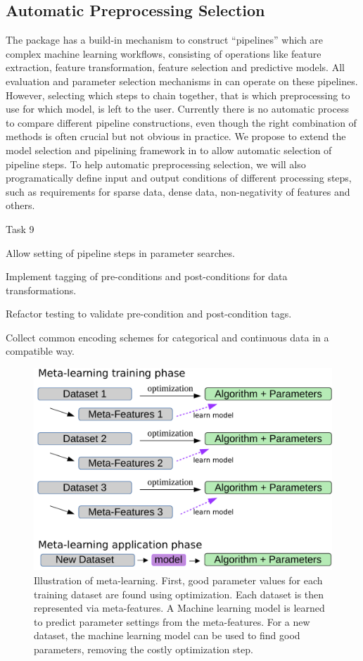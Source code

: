 \subsection{Automatic Preprocessing Selection}
The \sklearn{} package has a build-in mechanism to construct
``pipelines'' which are complex machine learning workflows, consisting of
operations like feature extraction, feature transformation, feature selection
and predictive models.  All evaluation and parameter selection mechanisms in
\sklearn{} can operate on these pipelines.
However, selecting which steps to chain together, that is which preprocessing
to use for which model, is left to the user. Currently there is no
automatic process to compare different pipeline constructions, even though
the right combination of methods is often crucial but not obvious in practice.
We propose to extend the model selection and pipelining framework in \sklearn{}
to allow automatic selection of pipeline steps.
To help automatic preprocessing selection, we will also programatically
define input and output conditions of different processing steps, such
as requirements for sparse data, dense data, non-negativity of features and others.
\begin{labeling}{Task 9}
    \itemsep-4pt
    \item [Task 6] Allow setting of pipeline steps in \sklearn{} parameter searches.
    \item [Task 7] Implement tagging of pre-conditions and post-conditions for data transformations.
    \item [Task 8] Refactor \sklearn{} testing to validate pre-condition and post-condition tags.
    \item [Task 9] Collect common encoding schemes for categorical and
        continuous data in a \sklearn{} compatible way.
\end{labeling}

\begin{figure}
    \centering
    \includegraphics[width=.6\linewidth]{meta-learning-diagram.pdf}
    \caption{Illustration of meta-learning. First, good parameter values for
        each training dataset are found using optimization. Each dataset is
        then represented via meta-features. A Machine learning model is learned
        to predict parameter settings from the meta-features. For a new
        dataset, the machine learning model can be used to find good
    parameters, removing the costly optimization step.}
    \label{meta-learning}
\end{figure}

